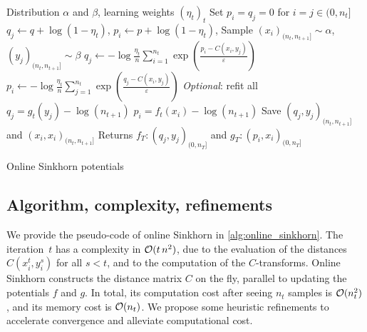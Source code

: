 \begin{algorithm}[t]
    \begin{algorithmic}
    \Input Distribution $\alpha$ and $\beta$, learning weights ${(\eta_t)}_t$
    \State Set $p_i = q_j = 0$ for $i = j \in (0, n_t]$
        \For{$i = j \in (0, n_t]$}
        \State $q_j \gets q + \log(1 - \eta_t)$, $p_i \gets p + \log(1 - \eta_t)$,
        \EndFor
        \State Sample $(x_i)_{(n_t, n_{t+1}]} \sim \alpha$, $(y_j)_{(n_t, n_{t+1}]} \sim \beta$
        \For{$i = j \in (n_t, n_{t+1}]$}
            \State $q_j \gets 
            - \log \frac{\eta_t}{n} 
            \sum_{i=1}^{n_t} \exp(\frac{p_i - C(x_i, y_j)}{\varepsilon})$
            \State $p_i \gets 
            - \log \frac{\eta_t}{n} 
            \sum_{j=1}^{n_t} \exp(\frac{q_j - C(x_i, y_j)}{\varepsilon})$
        \EndFor
        \State \textit{Optional}: refit all $q_j = g_t(y_j) - \log (n_{t+1})$
        \State\hspace{2.45cm} $p_i = f_t(x_i) - \log (n_{t+1})$
        \State Save $(q_j, y_j)_{(n_t,n_{t+1}]}$ and $(x_i, x_i)_{(n_t,n_{t+1}]}$
    \EndFor
    \State Returns $f_T : (q_j, y_j)_{(0, n_T]}$ and
    $g_T : (p_i, x_i)_{(0, n_T]}$
    \end{algorithmic}
    \caption{Online Sinkhorn potentials}\label{alg:online_sinkhorn}
\end{algorithm}

\subsection{Algorithm, complexity, refinements}

We provide the pseudo-code of online Sinkhorn in \autoref{alg:online_sinkhorn}.
The iteration~$t$ has a complexity in $\mathcal{O}(t\,n^2)$, due to the evaluation of
the distances $C(x_i^t, y_i^s)$ for all $s < t$, and to the computation of the
$C$-transforms. Online Sinkhorn constructs the distance matrix $C$ on the fly,
parallel to updating the potentials $f$ and $g$. In total, its computation cost
after seeing $n_t$ samples is $\mathcal{O}(n_t^2)$, and its memory cost is $\mathcal{O}(n_t)$.
We propose some heuristic refinements to accelerate convergence and alleviate
computational cost.


